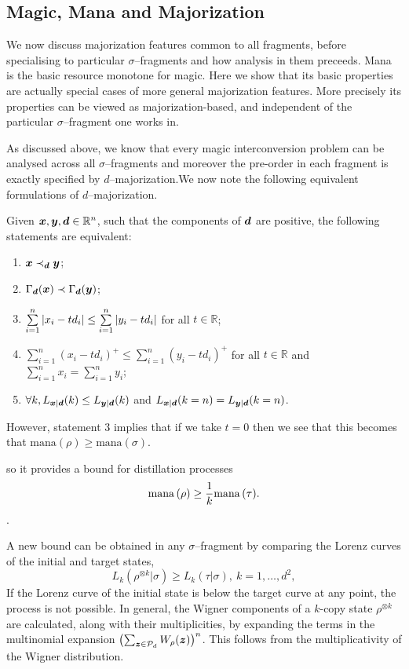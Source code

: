 \documentclass[pra,
aps,
twocolumn,
superscriptaddress,
groupedaddress,
nofootinbib,
reprint
]{revtex4-1}
\begin{document}
\subsection{Magic, Mana and Majorization}
We now discuss majorization features common to all fragments, before specialising to particular $\sigma$--fragments and how analysis in them preceeds. Mana is the basic resource monotone for magic. Here we show that its basic properties are actually special cases of more general majorization features. More precisely its properties can be viewed as majorization-based, and independent of the particular $\sigma$--fragment one works in.

As discussed above, we know that every magic interconversion problem can be analysed across all $\sigma$--fragments and moreover the pre-order in each fragment is exactly specified by $d$--majorization.We now note the following equivalent formulations of $d$--majorization.
\begin{theorem}
Given $\bm{x}, \bm{y}, \bm{d} \in \mathbb{R}^n$, such that the components of $\bm{d}$ are positive, the following statements are equivalent:
 \begin{enumerate}%
	\item $\bm{x} \prec_{\bm{d}} \bm{y}$;
	\item $\Gamma_{\bm{d}}({\bm{x}}) \prec \Gamma_{\bm{d}}({\bm{y}})$;
	\item\label{en:tm3} $\sum\limits_{i=1}^n \abs{x_i - t d_i} \leq \sum\limits_{i=1}^n \abs{y_i - t d_i}$ for all $t \in \mathbb{R}$;
	\item $\sum\limits_{i=1}^n (x_i - t d_i)^+ \leq \sum\limits_{i=1}^n (y_i - t d_i)^+$ for all $t \in \mathbb{R}$ and $\sum\limits_{i=1}^n x_i = \sum\limits_{i=1}^n y_i$;
	\item $\forall k, L_{\bm{x}|\bm{d}}(k) \leq L_{\bm{y}|\bm{d}}(k)$ and $L_{\bm{x}|\bm{d}}(k=n) = L_{\bm{y}|\bm{d}}(k=n)$.
 \end{enumerate}
\end{theorem}
However, statement 3 implies that if we take $t=0$ then we see that this becomes that $\mbox{mana}(\rho) \ge \mbox{mana}(\sigma)$. 

so it provides a bound for distillation processes
\begin{equation}
    {{\rm{mana}}\left(\rho\right)} \geq \frac{1}{k} {{\rm{mana}}\left(\tau\right)}.
\end{equation}.

A new bound can be obtained in any $\sigma$--fragment by comparing the Lorenz curves of the initial and target states,
\begin{equation}\label{eq:majbound}
    L_k(\rho^{\otimes k} | \sigma) \geq L_k (\tau | \sigma),\ k=1,\dots,d^2,
\end{equation}
If the Lorenz curve of the initial state is below the target curve at any point, the process is not possible.
In general, the Wigner components of a $k$-copy state $\rho^{\otimes k}$ are calculated, along with their multiplicities, by expanding the terms in the multinomial expansion $\left( \sum_{\bm{z} \in \mathcal{P}_d} W_\rho(\bm{z}) \right)^n$.
This follows from the multiplicativity of the Wigner distribution.
\end{document}

